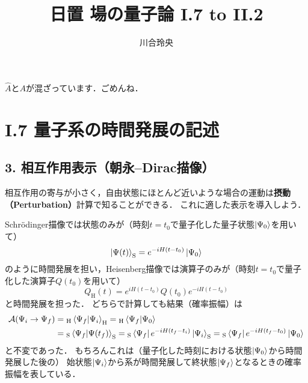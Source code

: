 \documentclass[dvipdfmx,uplatex]{jsarticle}
\numberwithin{theorem}{section}
\numberwithin{reibangou}{section}
\numberwithin{reidaibangou}{section}
\numberwithin{mondaibangou}{section}
\begin{document}
\title{日置 場の量子論 I.7 to II.2}
\author{川合玲央}

\maketitle

\begin{center}
    $\hat{A}$と$A$が混ざっています．ごめんね．
\end{center}

\section*{I.7 量子系の時間発展の記述}

\subsection*{3. 相互作用表示（朝永--Dirac描像）
\cite{日置qft}
\cite{AitchisonI}
}
相互作用の寄与が小さく，自由状態にほとんど近いような場合の運動は\textbf{摂動（Perturbation）}計算で知ることができる．
これに適した表示を導入しよう．

Schr\"{o}dinger描像では状態のみが（時刻$t = t_0$で量子化した量子状態$\ket{\Psi_0}$を用いて）
\begin{equation}
    \ket{\Psi(t)}_\text{S} = e^{-i H (t - t_0)} \ket{\Psi_0}
    \label{eq:Sch_pic}
\end{equation}
のように時間発展を担い，Heisenberg描像では演算子のみが（時刻$t = t_0$で量子化した演算子$Q(t_0)$を用いて）
\begin{equation}
    Q_\text{H}(t) = e^{i H (t - t_0)} Q(t_0) e^{-i H (t - t_0)}
    \label{eq:Hei_pic}
\end{equation}
と時間発展を担った．
どちらで計算しても結果（確率振幅）は
\begin{equation}
    \begin{split}
        \mathcal{A}(\Psi_i \to \Psi_f)
        &= {}_\text{H}\bra{\Psi_f} \ket{\Psi_i}_\text{H}
        = {}_\text{H}\bra{\Psi_f} \ket{\Psi_0} \\
        &= {}_\text{S}\bra{\Psi_f} \ket{\Psi(t_f)}_\text{S}
        = {}_\text{S}\bra{\Psi_f} e^{-i H (t_f - t_i)} \ket{\Psi_i}_\text{S}
        = {}_\text{S}\bra{\Psi_f} e^{-i H (t_f - t_0)} \ket{\Psi_0}
    \end{split}
    \label{eq:Amp}
\end{equation}
と不変であった．
もちろんこれは（量子化した時刻における状態$\ket{\Psi_0}$から時間発展した後の）
始状態$\ket{\Psi_i}$から系が時間発展して終状態$\ket{\Psi_f}$となるときの確率振幅を表している．
\end{document}
